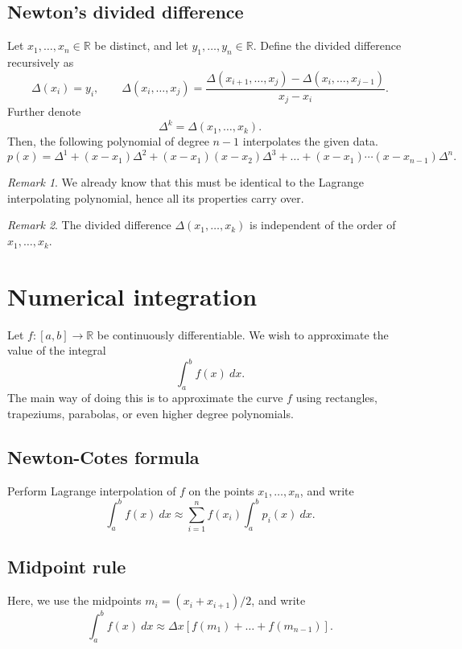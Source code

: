 \documentclass[11pt]{article}
\newcommand{\R}{\mathbb{R}}
\theoremstyle{definition}
\theoremstyle{remark}
\newtheorem*{remark}{Remark}
\numberwithin{equation}{section}
\begin{document}
    \subsection{Newton's divided difference}
    \begin{theorem}
        Let $x_1, \dots, x_n \in \R$ be distinct, and let $y_1, \dots, y_n \in \R$.
        Define the divided difference recursively as \[
            \Delta(x_i) = y_i, \qquad
            \Delta(x_i, \dots, x_j) = \frac{\Delta(x_{i + 1}, \dots, x_j) -
            \Delta(x_i, \dots, x_{j - 1})}{x_j - x_i}.
        \] Further denote \[
            \Delta^k = \Delta(x_1, \dots, x_k).
        \] Then, the following polynomial of degree $n - 1$ interpolates the given
        data. \[
            p(x) = \Delta^1 + (x - x_1)\Delta^2 + (x - x_1)(x - x_2)\Delta^3 + \dots
            + (x - x_1)\cdots(x - x_{n - 1})\Delta^n.
        \]

        \begin{remark}
            We already know that this must be identical to the Lagrange interpolating
            polynomial, hence all its properties carry over.
        \end{remark}
        \begin{remark}
            The divided difference $\Delta(x_1, \dots, x_k)$ is independent of the
            order of $x_1, \dots, x_k$.
        \end{remark}
    \end{theorem}


    \section{Numerical integration}
    Let $f\colon [a, b] \to \R$ be continuously differentiable. We wish to
    approximate the value of the integral \[
        \int_a^b f(x)\:dx.
    \] The main way of doing this is to approximate the curve $f$ using rectangles,
    trapeziums, parabolas, or even higher degree polynomials.

    \subsection{Newton-Cotes formula}
    Perform Lagrange interpolation of $f$ on the points $x_1, \dots, x_n$, and write \[
        \int_a^b f(x)\:dx \approx \sum_{i = 1}^n f(x_i)\int_a^b p_i(x)\:dx.
    \] 
    
    \subsection{Midpoint rule}
    Here, we use the midpoints $m_i = (x_{i} + x_{i + 1}) / 2$, and write \[
        \int_a^b f(x)\:dx \approx \Delta x\left[f(m_1) + \dots + f(m_{n - 1})\right].
    \] 
\end{document}
